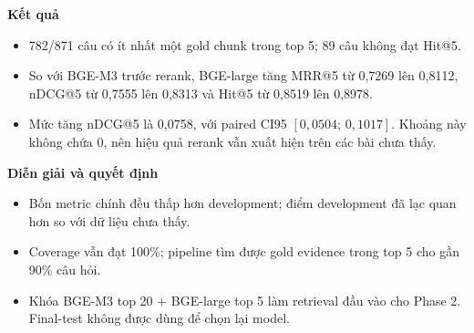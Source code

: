 \noindent\textbf{Kết quả}
\begin{itemize}
  \item 782/871 câu có ít nhất một gold chunk trong top 5; 89 câu không đạt
  Hit@5.
  \item So với BGE-M3 trước rerank, BGE-large tăng MRR@5 từ 0,7269 lên 0,8112,
  nDCG@5 từ 0,7555 lên 0,8313 và Hit@5 từ 0,8519 lên 0,8978.
  \item Mức tăng nDCG@5 là 0,0758, với paired CI95
  $[0,0504;\,0,1017]$. Khoảng này không chứa 0, nên hiệu quả rerank vẫn xuất
  hiện trên các bài chưa thấy.
\end{itemize}

\noindent\textbf{Diễn giải và quyết định}
\begin{itemize}
  \item Bốn metric chính đều thấp hơn development; điểm development đã lạc
  quan hơn so với dữ liệu chưa thấy.
  \item Coverage vẫn đạt 100\%; pipeline tìm được gold evidence trong top 5 cho
  gần 90\% câu hỏi.
  \item Khóa BGE-M3 top 20 + BGE-large top 5 làm retrieval đầu vào cho Phase 2.
  Final-test không được dùng để chọn lại model.
\end{itemize}
